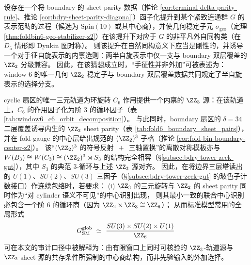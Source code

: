 \begin{conjecture}\label{conj:bdry-geo-z2-chiral-selection}
设存在一个将 boundary 的 sheet parity 数据（推论 \ref{cor:terminal-delta-parity-rule}、推论 \ref{cor:bdry-sheet-parity-diagonal}）函子化提升到某个紧致连通群 \(G\) 的表示范畴的过程（候选为 \(\mathrm{Spin}(10)\) 或其中心商），并使几何稳定子元 \(\sigma_{\mathrm{geo}}\)（定理 \ref{thm:foldbin6-geo-stabilizer-z2}）在该提升下对应于 \(G\) 的非平凡外自同构类（在 \(D_5\) 情形即 Dynkin 图对称）。
则该提升在自然同构意义下应当是刚性的，并诱导一个对手征自旋表示的内禀选则：两半自旋表示中仅一支与 boundary 双层覆盖的 \(\ZZ_2\) 分级兼容。
因此，在该猜想成立时，“手征性并非外加”可被表述为：window-\(6\) 的唯一几何 \(\ZZ_2\) 稳定子与 boundary 双层覆盖数据共同规定了半自旋表示的选择分支。
\end{conjecture}

\begin{corollary}[全局中心识别的最小一致性：\texorpdfstring{$\ZZ_2\times\ZZ_3\cong\ZZ_6$}{Z2xZ3=Z6}]\label{cor:bdry-global-z6-quotient}
cyclic 扇区的唯一三元轨道为环旋转 \(C_6\) 作用提供一个内禀的 \(\ZZ_3\) 源：在该轨道上，\(C_6\) 的作用因子化为阶 \(3\) 的循环因子（表 \ref{tab:window6_c6_orbit_decomposition}）。
与此同时，boundary 扇区的 \(\delta=34\) 二层覆盖诱导内生的 \(\ZZ_2\) sheet parity（表 \ref{tab:fold6_boundary_sheet_pairs}），并在 fold-gauge 的中心层给出规范的 \((\ZZ_2)^3\) 子格（推论 \ref{cor:fold-bin-boundary-center-z2}）。
该“\((\ZZ_2)^3\) 的符号反射 \(\,+\,\) 三轴置换”的离散对称模板亦与 \(W(B_3)\cong W(C_3)\cong (\ZZ_2)^3\rtimes S_3\) 的结构完全相容（\S\ref{subsec:bdry-tower-zeck-gut}），其中 \(S_3\) 的典范 \(3\)-循环与上述 \(\ZZ_3\) 源对齐。
因此，在将边界三层塔读出的 \(U(1)\)、\(SU(2)\)、\(SU(3)\) 三因子（\S\ref{subsec:bdry-tower-zeck-gut} 的玻色子计数接口）作连续包络时，若要求：
(i) \(\ZZ_3\) 的三元旋转与 \(\ZZ_2\) 的 sheet parity 同时作为“对 cylinder 语义不可见”的中心识别出现，
则其最小一致的联合中心识别必包含一个阶 \(6\) 的循环商（因为 \(\ZZ_2\times\ZZ_3\cong\ZZ_6\)）；
从而标准模型常用的全局形式
\[
G_{\mathrm{SM}}^{\mathrm{glob}}
\ \simeq\
\frac{SU(3)\times SU(2)\times U(1)}{\ZZ_6}
\]
可在本文的审计口径中被解释为：由有限窗口上同时可核验的 \(\ZZ_3\)-轨道源与 \(\ZZ_2\)-sheet 源的共存条件所强制的中心商结构，而非先验输入的外加选择。
\leanverified{z2\_times\_z3\_card}
\end{corollary}

